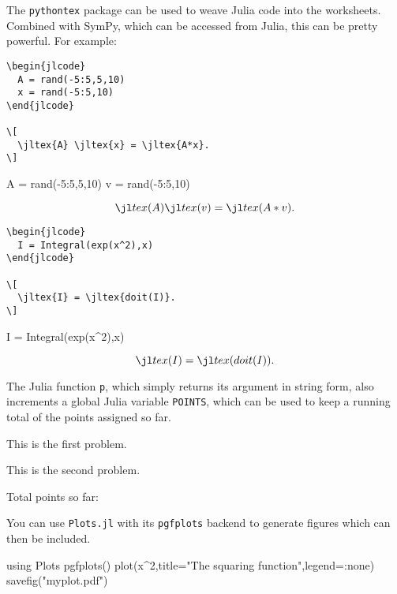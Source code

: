 \documentclass[julia,solutions]{worksheet}
\begin{document}
The \texttt{pythontex} package can be used to weave Julia code into the worksheets. Combined with SymPy, which can be accessed from Julia, this can be pretty powerful. For example: 

\begin{verbatim} 
\begin{jlcode}
  A = rand(-5:5,5,10)
  x = rand(-5:5,10)
\end{jlcode}

\[
  \jltex{A} \jltex{x} = \jltex{A*x}. 
\]
\end{verbatim}

\begin{jlcode}
  A = rand(-5:5,5,10)
  v = rand(-5:5,10)
\end{jlcode}

\[
  \jltex{A} \jltex{v} = \jltex{A*v}. 
\]

\begin{verbatim}
\begin{jlcode}
  I = Integral(exp(x^2),x)
\end{jlcode}

\[
  \jltex{I} = \jltex{doit(I)}. 
\]
\end{verbatim}

\begin{jlcode}
  I = Integral(exp(x^2),x)
\end{jlcode}

\[
  \jltex{I} = \jltex{doit(I)}. 
\]

The Julia function \texttt{p}, which simply returns its argument in string form, also increments a global Julia variable \texttt{POINTS}, which can be used to keep a running total of the points assigned so far.

\begin{problem}[title = Problem \itm (\jltex{p(5)} points)]
  This is the first problem. 
\end{problem}

\begin{problem}[title = Problem \itm (\jltex{p(8)} points)]
  This is the second problem. 
\end{problem}

Total points so far: 

You can use \texttt{Plots.jl} with its \texttt{pgfplots} backend to
generate figures which can then be included. 

\begin{jlcode}
  using Plots
  pgfplots()
  plot(x^2,title="The squaring function",legend=:none)
  savefig("myplot.pdf")
\end{jlcode}

\begin{center}
\end{center}
\end{document}
